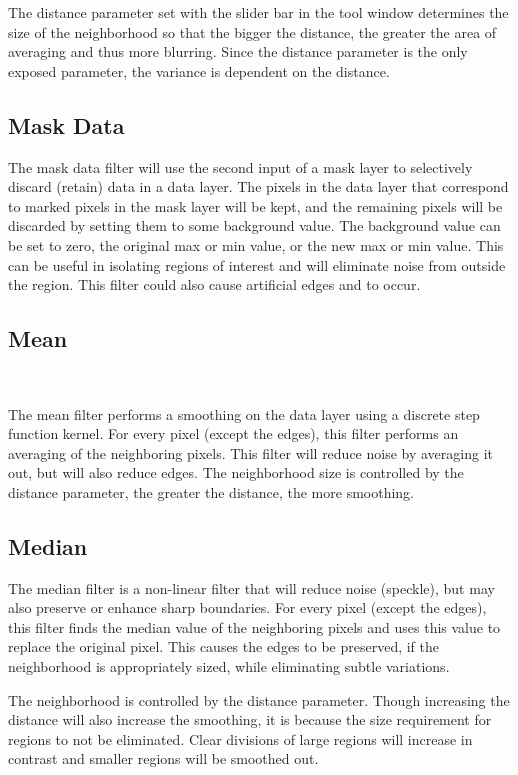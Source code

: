 \documentclass[fleqn,11pt,openany]{book}
\begin{document}
The distance parameter set with the slider bar in the tool window determines the size of the neighborhood so that the bigger the distance, the greater the area of averaging and thus more blurring.  Since the distance parameter is the only exposed parameter, the variance is dependent on the distance.

\subsection{Mask Data}

The mask data filter will use the second input of a mask layer to selectively discard (retain) data in a data layer.  The pixels in the data layer that correspond to marked pixels in the mask layer will be kept, and the remaining pixels will be discarded by setting them to some background value.  The background value can be set to zero, the original max or min value, or the new max or min value.  This can be useful in isolating regions of interest and will eliminate noise from outside the region.  This filter could also cause artificial edges and to occur.

\subsection{Mean}\

The mean filter performs a smoothing on the data layer using a discrete step function kernel.  For every pixel (except the edges), this filter performs an averaging of the neighboring pixels.  This filter will reduce noise by averaging it out, but will also reduce edges.  The neighborhood size is controlled by the distance parameter, the greater the distance, the more smoothing.

\subsection{Median}

The median filter is a non-linear filter that will reduce noise (speckle), but may also preserve or enhance sharp boundaries. For every pixel (except the edges), this filter finds the median value of the neighboring pixels and uses this value to replace the original pixel.  This causes the edges to be preserved, if the neighborhood is appropriately sized, while eliminating subtle variations.  

The neighborhood is controlled by the distance parameter.  Though increasing the distance will also increase the smoothing, it is because the size requirement for regions to not be eliminated.  Clear divisions of large regions will increase in contrast and smaller regions will be smoothed out.  
\end{document}
